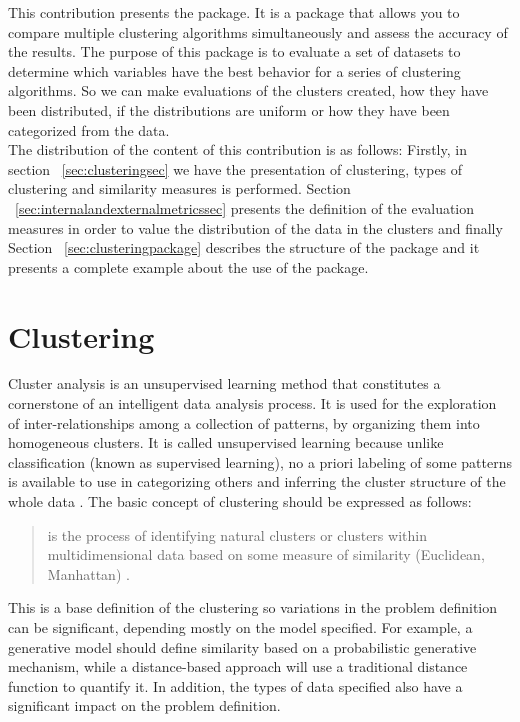 This contribution presents the  package. It is a package that allows you to compare multiple clustering algorithms simultaneously and assess the accuracy of the results. The purpose of this package is to evaluate a set of datasets to determine which variables have the best behavior for a series of clustering algorithms. So we can make evaluations of the clusters created, how they have been distributed, if the distributions are uniform or how they have been categorized from the data.\\
The distribution of the content of this contribution is as follows: Firstly, in section ~\ref{sec:clusteringsec} we have the  presentation of clustering, types of clustering and similarity measures is performed. Section ~\ref{sec:internalandexternalmetricssec} presents the definition of the evaluation measures in order to value the distribution of the data in the clusters and finally Section ~\ref{sec:clusteringpackage} describes the structure of the package and it presents a complete example about the use of the package.

\section*{Clustering}\label{sec:clusteringsec}

Cluster analysis is an unsupervised learning method that constitutes a cornerstone of an intelligent data analysis process. It is used for the exploration of inter-relationships among a collection of patterns, by organizing them into homogeneous clusters. It is called unsupervised learning because unlike classification (known as supervised learning), no a priori labeling of some patterns is available to use in categorizing others and inferring the cluster structure of the whole data \citep{b17}. The basic concept of clustering should be expressed as follows:
\\
\begin{quote}
 is the process of identifying natural clusters or clusters within multidimensional data based on some measure of similarity (Euclidean, Manhattan) \citep{b18}.
\end{quote}


This is a base definition of the clustering so variations in the problem definition can be significant, depending mostly on the model specified. For example, a generative model should define similarity based on a probabilistic generative mechanism, while a distance-based approach will use a traditional distance function to quantify it. In addition, the types of data specified also have a significant impact on the problem definition.

